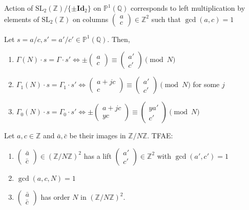 \documentclass[oneside, 12pt]{scrbook}
\newcommand{\QQ}{\mathbb Q}
\newcommand{\ZZ}{\mathbb Z}
\newcommand{\PP}{\mathbb{P}}
\newcommand{\SL}{\mathrm{SL}}
\theoremstyle{theorem}
\begin{document}
\begin{remark}
Action of $\SL_{2}(\ZZ)/\{\pm \mathbf{Id}_{2}\}$ on $\PP^1(\QQ)$ corresponds to left multiplication by elements of $\SL_{2}(\ZZ)$ on columns $\begin{pmatrix}
a \\ c
\end{pmatrix} \in \ZZ^2$ such that $\gcd(a,c)=1$
\end{remark}

\begin{proposition}
Let $s= a/c , s' = a'/c' \in \PP^1(\QQ)$. Then, 
\begin{enumerate}
\item $\Gamma(N) \cdot s = \Gamma \cdot s' \Leftrightarrow \pm  \begin{pmatrix}
a \\ c
\end{pmatrix} \equiv \begin{pmatrix}
a' \\ c'
\end{pmatrix} \pmod{N}$
\item $\Gamma_{1}(N) \cdot s = \Gamma_{1} \cdot s' \Leftrightarrow \begin{pmatrix}
a+ jc \\ c
\end{pmatrix} \equiv \begin{pmatrix}
a' \\ c'
\end{pmatrix} \pmod{N}$ for some $j$
\item $\Gamma_{0}(N) \cdot s = \Gamma_{0} \cdot s' \Leftrightarrow \pm \begin{pmatrix}
a + jc \\ yc
\end{pmatrix} \equiv \begin{pmatrix}
ya' \\ c'
\end{pmatrix} \pmod{N}$
\end{enumerate}
\end{proposition}

\begin{lemma}
Let $a,c \in \ZZ $ and $\bar{a}, \bar{c}$ be their images in $\ZZ/N\ZZ$. TFAE: 
\begin{enumerate}
\item $\begin{pmatrix}
\bar{a} \\ \bar{c}
\end{pmatrix} \in (\ZZ/N\ZZ)^2$ has a lift $\begin{pmatrix}
a' \\ c'
\end{pmatrix}\in \ZZ^2  $ with $\gcd(a',c')=1$
\item $\gcd(a,c,N)=1$
\item $\begin{pmatrix}
\bar{a} \\ \bar{c}
\end{pmatrix}$ has order $N$ in $(\ZZ/N\ZZ)^2$.
\end{enumerate}
\end{lemma}
\end{document}
